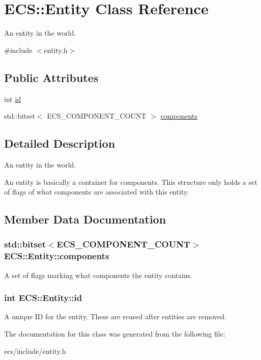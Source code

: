 \hypertarget{class_e_c_s_1_1_entity}{\section{E\-C\-S\-:\-:Entity Class Reference}
\label{class_e_c_s_1_1_entity}
}


An entity in the world.  




{\ttfamily \#include $<$entity.\-h$>$}

\subsection*{Public Attributes}
\begin{DoxyCompactItemize}
\item 
int \hyperlink{class_e_c_s_1_1_entity_a96a315e99204b7be2324c4b95be15a82}{id}
\item 
std\-::bitset$<$ E\-C\-S\-\_\-\-C\-O\-M\-P\-O\-N\-E\-N\-T\-\_\-\-C\-O\-U\-N\-T $>$ \hyperlink{class_e_c_s_1_1_entity_a379c4406de263f9fd2494b52b35666e1}{components}
\end{DoxyCompactItemize}


\subsection{Detailed Description}
An entity in the world. 

An entity is basically a container for components. This structure only holds a set of flags of what components are associated with this entity. 

\subsection{Member Data Documentation}
\hypertarget{class_e_c_s_1_1_entity_a379c4406de263f9fd2494b52b35666e1}{
\subsubsection[{components}]{\setlength{\rightskip}{0pt plus 5cm}std\-::bitset$<$E\-C\-S\-\_\-\-C\-O\-M\-P\-O\-N\-E\-N\-T\-\_\-\-C\-O\-U\-N\-T$>$ E\-C\-S\-::\-Entity\-::components}}\label{class_e_c_s_1_1_entity_a379c4406de263f9fd2494b52b35666e1}
A set of flags marking what components the entity contains. \hypertarget{class_e_c_s_1_1_entity_a96a315e99204b7be2324c4b95be15a82}{
\subsubsection[{id}]{\setlength{\rightskip}{0pt plus 5cm}int E\-C\-S\-::\-Entity\-::id}}\label{class_e_c_s_1_1_entity_a96a315e99204b7be2324c4b95be15a82}
A unique I\-D for the entity. These are reused after entities are removed. 

The documentation for this class was generated from the following file\-:\begin{DoxyCompactItemize}
\item 
ecs/include/entity.\-h\end{DoxyCompactItemize}
